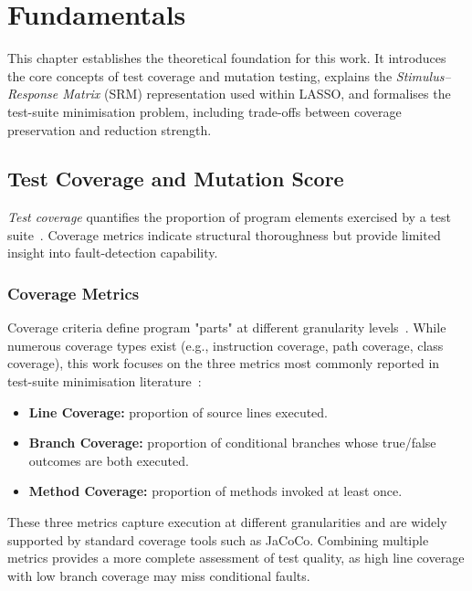 \chapter{Fundamentals}\label{chap:fundamentals}

This chapter establishes the theoretical foundation for this work. It introduces the core concepts of test coverage and mutation testing, explains the \emph{Stimulus--Response Matrix} (SRM) representation used within LASSO, and formalises the test-suite minimisation problem, including trade-offs between coverage preservation and reduction strength.

\section{Test Coverage and Mutation Score}

\emph{Test coverage} quantifies the proportion of program elements exercised by a test suite~\cite{zhu1997}. Coverage metrics indicate structural thoroughness but provide limited insight into fault-detection capability.

\subsection{Coverage Metrics}

Coverage criteria define program "parts" at different granularity levels~\cite{zhu1997}. While numerous coverage types exist (e.g., instruction coverage, path coverage, class coverage), this work focuses on the three metrics most commonly reported in test-suite minimisation literature~\cite{yoo2012,harrold1993,jehan2023,noemmer2020}:

\begin{itemize}
  \item \textbf{Line Coverage:} proportion of source lines executed.
  \item \textbf{Branch Coverage:} proportion of conditional branches whose true/false outcomes are both executed.
  \item \textbf{Method Coverage:} proportion of methods invoked at least once.
\end{itemize}

These three metrics capture execution at different granularities and are widely supported by standard coverage tools such as JaCoCo. Combining multiple metrics provides a more complete assessment of test quality, as high line coverage with low branch coverage may miss conditional faults.

